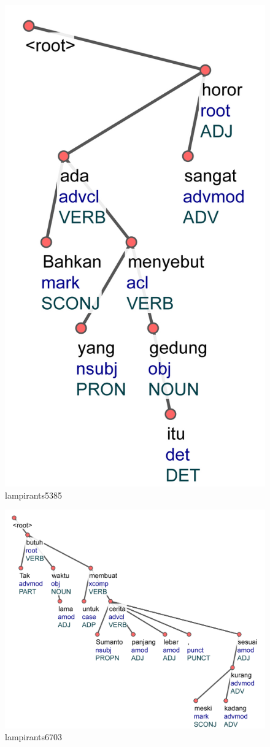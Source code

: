 \begin{figure}
	\centering \includegraphics[width=0.8
	\textwidth] {pics/lampiran/lampirants5385.jpg} 
	\caption{lampirants5385} 
	\label{fig:lampirants5385} 
\end{figure}

\begin{figure}
	\centering \includegraphics[width=0.8
	\textwidth] {pics/lampiran/lampirants6703.jpg} 
	\caption{lampirants6703} 
	\label{fig:lampirants6703} 
\end{figure}


